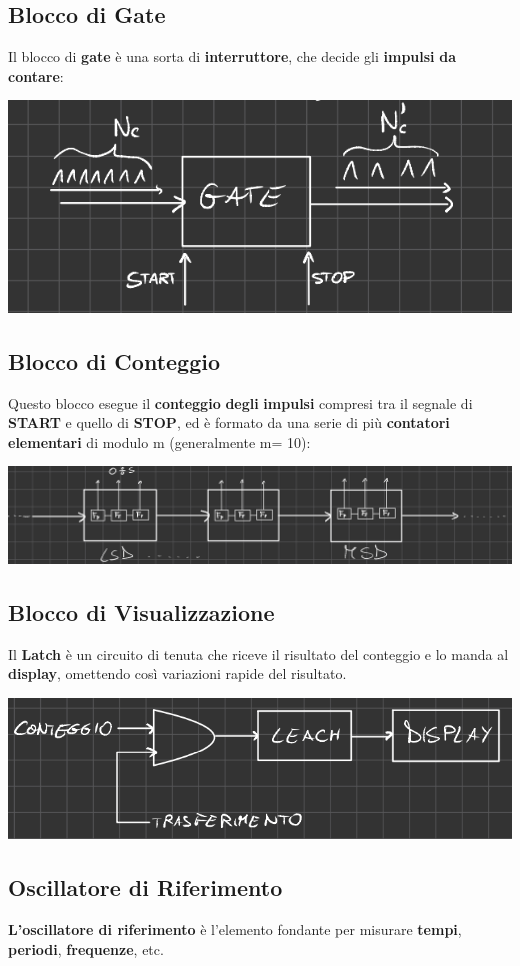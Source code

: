 \subsection{Blocco di Gate}
Il blocco di \textbf{gate} è una sorta di \textbf{interruttore}, che decide gli \textbf{impulsi} \textbf{da} \textbf{contare}:
\begin{center}
    \includegraphics[width=.6\textwidth]{Images/figure8.png}
\end{center}
\subsection{Blocco di Conteggio}
Questo blocco esegue il \textbf{conteggio} \textbf{degli} \textbf{impulsi} compresi tra il segnale di \textbf{START} e quello di \textbf{STOP}, ed è formato da una serie di più \textbf{contatori elementari} di modulo m (generalmente m= 10):
\begin{center}
    \includegraphics[width=.8\textwidth]{Images/figure9.png}
\end{center}
\subsection{Blocco di Visualizzazione}
Il \textbf{Latch} è un circuito di tenuta che riceve il risultato del conteggio e lo manda al \textbf{display}, omettendo così variazioni rapide del risultato.
\begin{center}
    \includegraphics[width=.8\textwidth]{Images/figure10.png}
\end{center}
\subsection{Oscillatore di Riferimento}
\textbf{L'oscillatore di riferimento} è l'elemento fondante per misurare \textbf{tempi}, \textbf{periodi}, \textbf{frequenze}, etc.
